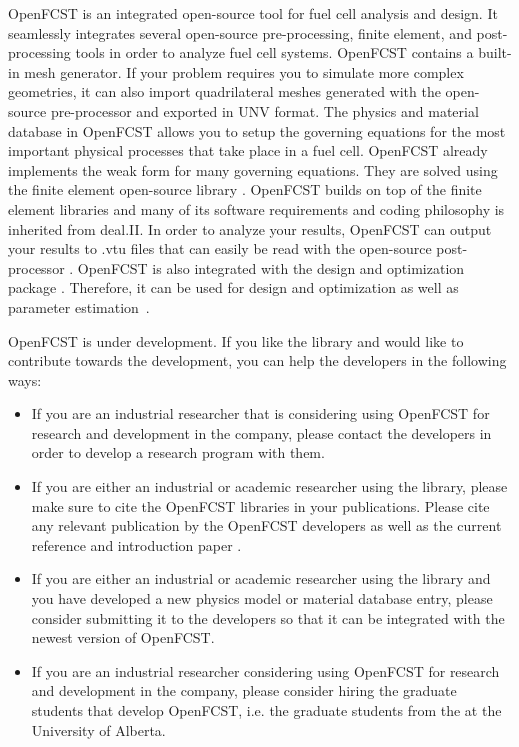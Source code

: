 OpenFCST is an integrated open-source tool for fuel cell analysis and design. It seamlessly integrates several open-source pre-processing, finite element, and post-processing tools in order to analyze fuel cell systems. OpenFCST contains a built-in mesh generator. If your problem requires you to simulate more complex geometries, it can also import quadrilateral meshes generated with the open-source pre-processor  and exported in UNV format. The physics and material database in OpenFCST allows you to setup the governing equations for the most important physical processes that take place in a fuel cell. OpenFCST already implements the weak form for many governing equations. They are solved using the finite element open-source library . OpenFCST builds on top of the  finite element libraries and many of its software requirements and coding philosophy is inherited from deal.II. In order to analyze your results, OpenFCST can output your results to .vtu files that can easily be read with the open-source post-processor . OpenFCST is also integrated with the design and optimization package . Therefore, it can be used for design and optimization as well as parameter estimation~\cite{Secanell07,Secanell07b,Secanell08,Dobson12}.

OpenFCST is under development. If you like the library and would like to contribute towards the development, you can help the developers in the following ways:
\begin{itemize}
 \item If you are an industrial researcher that is considering using OpenFCST for research and development in the company, please contact the developers in order to develop a research program with them. 
 \item If you are either an industrial or academic researcher using the library, please make sure to cite the OpenFCST libraries in your publications. Please cite any relevant publication by the OpenFCST developers as well as the current reference \cite{Secanell13} and introduction paper \cite{Secanell14}.
 \item If you are either an industrial or academic researcher using the library and you have developed a new physics model or material database entry, please consider submitting it to the developers so that it can be integrated with the newest version of OpenFCST.
 \item If you are an industrial researcher considering using OpenFCST for research and development in the company, please consider hiring the graduate students that develop OpenFCST, i.e. the graduate   students from the  at the University of Alberta.
\end{itemize}

